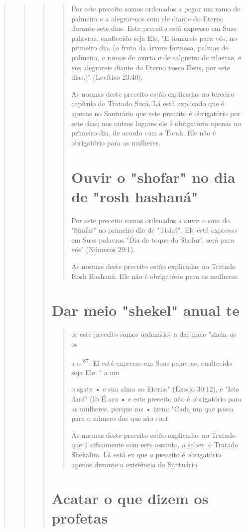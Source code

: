 \begin{quote}
\begin{quote}
\begin{quote}
\begin{quote}
Por este preceito somos ordenados a pegar um ramo de palmeira e a
alegrar-nos com ele diante do Eterno durante sete dias. Este preceito
está ex­presso em Suas palavras, enaltecido seja Ele, "E tomareis para
vós, no primeiro dia, (o fruto da árvore formosa, palmas de palmeira, e
ramos de murta e de sal­gueiro de ribeiras, e vos alegrareis diante do
Eterno vosso Deus, por sete dias.)" (Levítico 23:40).

As normas deste preceito estão explicadas no terceiro capítulo do
Tratado Sucá. Lá está explicado que é apenas no Santuário que este
preceito é obrigatório por sete dias; nos outros lugares ele é
obrigatório apenas no pri­meiro dia, de acordo com a Torah. Ele não é
obrigatório para as mulheres.

\section{Ouvir o "shofar" no dia de "rosh hashaná"}

Por este preceito somos ordenados a ouvir o som do "Shofar" no primeiro
dia de "Tishri". Ele está expresso em Suas palavras "Dia de toque do
Shofar', será para vós" (Números 29:1).

As normas deste preceito estão explicadas no Tratado Rosh Hasha­ná. Ele
não é obrigatório para as mulheres.
\end{quote}

\section{Dar meio "shekel" anual te}

\begin{quote}
or este preceito somos ordenados a dar meio "sheke os os

a o \textsuperscript{87}. El está expresso em Suas palavras, enaltecido
seja Ele: " a um

o sgate • e sua alma ao Eterno" (Êxodo 30:12), e "Isto dará" (Ib É aro •
e este preceito não é obrigatório para as mulheres, porque ras • izem:
"Cada um que passa para o número dos que são cont

As normas deste preceito estão explicadas no Tratado que 1 cificamente
com este assunto, a saber, o Tratado Shekalim. Lá está ex que o preceito
é obrigatório apenas durante a existência do Santuário.
\end{quote}

\section{Acatar o que dizem os profetas}


\end{quote}
\end{quote}
\end{quote}
